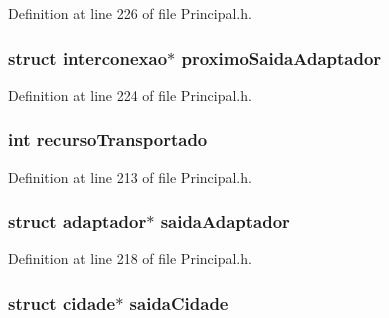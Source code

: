 Definition at line 226 of file Principal.\-h.

\hypertarget{structinterconexao_a0f78c20456e02f17b9c66806392b7f80}{
\subsubsection[{proximo\-Saida\-Adaptador}]{\setlength{\rightskip}{0pt plus 5cm}struct {\bf interconexao}$\ast$ proximo\-Saida\-Adaptador}}\label{structinterconexao_a0f78c20456e02f17b9c66806392b7f80}


Definition at line 224 of file Principal.\-h.

\hypertarget{structinterconexao_aa7760e925040fa4b54d3a847e27c0f82}{
\subsubsection[{recurso\-Transportado}]{\setlength{\rightskip}{0pt plus 5cm}int recurso\-Transportado}}\label{structinterconexao_aa7760e925040fa4b54d3a847e27c0f82}


Definition at line 213 of file Principal.\-h.

\hypertarget{structinterconexao_a89f6d0b2c88bb33283e80d439c01c575}{
\subsubsection[{saida\-Adaptador}]{\setlength{\rightskip}{0pt plus 5cm}struct {\bf adaptador}$\ast$ saida\-Adaptador}}\label{structinterconexao_a89f6d0b2c88bb33283e80d439c01c575}


Definition at line 218 of file Principal.\-h.

\hypertarget{structinterconexao_aa1457ad6c3cc7f9f64db35f10bda7133}{
\subsubsection[{saida\-Cidade}]{\setlength{\rightskip}{0pt plus 5cm}struct {\bf cidade}$\ast$ saida\-Cidade}}\label{structinterconexao_aa1457ad6c3cc7f9f64db35f10bda7133}


